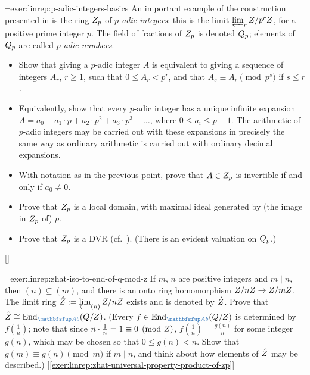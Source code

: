 \begin{exer}{$\lnot$}{exer:linrep:p-adic-integers-basics}
  An important example of the construction presented in
   is the ring $Z_p$ of
  \emph{$p$-adic integers}: this is the limit
  $\varprojlim_r Z/p^rZ$, for a positive prime integer $p$. The
  field of fractions of $Z_p$ is denoted $Q_p$; elements of $Q_p$
  are called \emph{$p$-adic numbers}.
  \begin{itemize}
  \item Show that giving a $p$-adic integer $A$ is equivalent to
    giving a sequence of integers $A_r$, $r \geq 1$, such that
    $0 \leq A_r < p^r$, and that $A_s \equiv A_r \pmod{p^s}$ if
    $s \leq r$.
  \item Equivalently, show that every $p$-adic integer has a unique
    infinite expansion
    $A = a_0 + a_1 \cdot p + a_2 \cdot p^2 + a_3 \cdot p^3 + \dots$,
    where $0 \leq a_i \leq p - 1$. The arithmetic of $p$-adic integers
    may be carried out with these expansions in precisely the same way
    as ordinary arithmetic is carried out with ordinary decimal
    expansions.
  \item With notation as in the previous point, prove that
    $A \in Z_p$ is invertible if and only if $a_0 \neq 0$.
  \item Prove that $Z_p$ is a local domain, with maximal ideal
    generated by (the image in $Z_p$ of) $p$.
  \item Prove that $Z_p$ is a DVR (cf.\
    ).  (There is an
    evident valuation on $Q_p$.)
  \end{itemize}
  []
\end{exer}

\begin{exer}{$\lnot$}{exer:linrep:zhat-iso-to-end-of-q-mod-z}
  If $m$, $n$ are positive integers and $m \mid n$, then
  $(n) \subseteq (m)$, and there is an onto ring homomorphism
  $Z/nZ \to Z/mZ$. The limit ring
  $\hat{Z} := \varprojlim_{(n)} Z/nZ$ exists and is denoted by
  $\hat{Z}$. Prove that
  $\hat{\Z} \cong \mathrm{End}_{\categ{Ab}}(\Q/\Z)$.  (Every
  $f \in \mathrm{End}_{\categ{Ab}}(\Q/\Z)$ is determined by
  $f(\tfrac{1}{n})$; note that since
  $n \cdot \tfrac{1}{n} = 1 \equiv 0 \pmod{Z}$,
  $f(\tfrac{1}{n}) = \tfrac{g(n)}{n}$ for some integer $g(n)$, which
  may be chosen so that $0 \leq g(n) < n$.  Show that
  $g(m) \equiv g(n) \pmod{m}$ if $m \mid n$, and think about how
  elements of $\hat{Z}$ may be described.)
  [\ref{exer:linrep:zhat-universal-property-product-of-zp}]
\end{exer}


